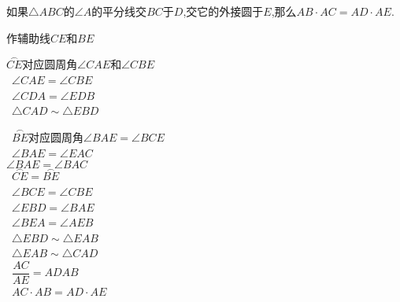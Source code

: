 \documentclass[answers]{exam}
\begin{document}
\begin{questions}
	\question 如果$\triangle{ABC}$的$\angle{A}$的平分线交$BC$于$D$,交它的外接圆于$E$,那么$AB\cdot AC = AD \cdot AE$.
	\begin{figure*}[htbp]
		\centering
	\end{figure*}
	\begin{solution}
		\begin{mathenum}
			\item 作辅助线$CE$和$BE$
			\item \because $\overset{\frown}{CE}$对应圆周角$\angle{CAE}$和$\angle{CBE}$
			\\ \therefore\ $\angle{CAE} = \angle{CBE}$
			\\ \because\ $\angle{CDA} = \angle{EDB} $
			\\ \therefore\ $\triangle{CAD} \sim \triangle{EBD}$
			\item \because\ $\overset{\frown}{BE}$对应圆周角$\angle{BAE} = \angle{BCE}$
			\\ \therefore\ $\angle{BAE} = \angle{EAC}$
			\\ \because $\angle{BAE} = \angle{BAC}$
			\\ \therefore\ $\overset{\frown}{CE} = \overset{\frown}{BE}$
			\\ \therefore\ $\angle{BCE} = \angle{CBE}$
			\\ \therefore\ $\angle{EBD} = \angle{BAE}$
			\\ \because\ $\angle{BEA} = \angle{AEB}$
			\\ \therefore\ $\triangle{EBD} \sim \triangle{EAB}$
			\\ \therefore\ $\triangle{EAB} \sim \triangle{CAD}$
			\\ \therefore\ $\dfrac{AC}{AE}={AD}{AB}$
			\\ \therefore\ $AC\cdot AB = AD\cdot AE$
		\end{mathenum}


\end{solution}
\end{questions}
\end{document}
